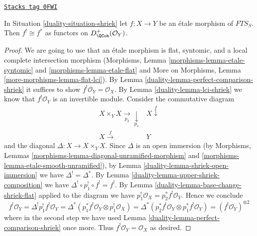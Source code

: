 \begin{lemma}
\label{duality-lemma-shriek-etale}
\href{https://stacks.math.columbia.edu/tag/0FWI}{\texttt{Stacks tag 0FWI}}

In Situation \ref{duality-situation-shriek} let $f : X \to Y$ be an \'etale
morphism of $\textit{FTS}_S$. Then $f^! \cong f^*$ as functors on
$D^+_\QCoh(\mathcal{O}_Y)$.
\end{lemma}

\begin{proof}

We are going to use that an \'etale morphism is flat, syntomic,
and a local complete intersection morphism
(Morphisms, Lemma \ref{morphisms-lemma-etale-syntomic} and
\ref{morphisms-lemma-etale-flat} and
More on Morphisms, Lemma \ref{more-morphisms-lemma-flat-lci}).
By Lemma \ref{duality-lemma-perfect-comparison-shriek} it suffices
to show $f^!\mathcal{O}_Y = \mathcal{O}_X$.
By Lemma \ref{duality-lemma-lci-shriek} we know that $f^!\mathcal{O}_Y$
is an invertible module. Consider the commutative diagram
$$
\begin{array}{cc}X \times_Y X \underset{p_2}{\longrightarrow}\underset{p_1}{\downarrow} & X \overset{f}{\downarrow} \\ X \overset{f}{\longrightarrow} & Y\end{array}
$$
and the diagonal $\Delta : X \to X \times_Y X$. Since $\Delta$
is an open immersion (by Morphisms, Lemmas
\ref{morphisms-lemma-diagonal-unramified-morphism} and
\ref{morphisms-lemma-etale-smooth-unramified}), by
Lemma \ref{duality-lemma-shriek-open-immersion} we have $\Delta^! = \Delta^*$.
By Lemma \ref{duality-lemma-upper-shriek-composition} we have
$\Delta^! \circ p_1^! \circ f^! = f^!$.
By Lemma \ref{duality-lemma-base-change-shriek-flat} applied to
the diagram we have $p_1^!\mathcal{O}_X = p_2^*f^!\mathcal{O}_Y$.
Hence we conclude
$$
f^!\mathcal{O}_Y = \Delta^!p_1^!f^!\mathcal{O}_Y =
\Delta^*(p_1^*f^!\mathcal{O}_Y \otimes p_1^!\mathcal{O}_X) =
\Delta^*(p_2^*f^!\mathcal{O}_Y \otimes p_1^*f^!\mathcal{O}_Y) =
(f^!\mathcal{O}_Y)^{\otimes 2}
$$
where in the second step we have used
Lemma \ref{duality-lemma-perfect-comparison-shriek} once more.
Thus $f^!\mathcal{O}_Y = \mathcal{O}_X$ as desired.
\end{proof}


